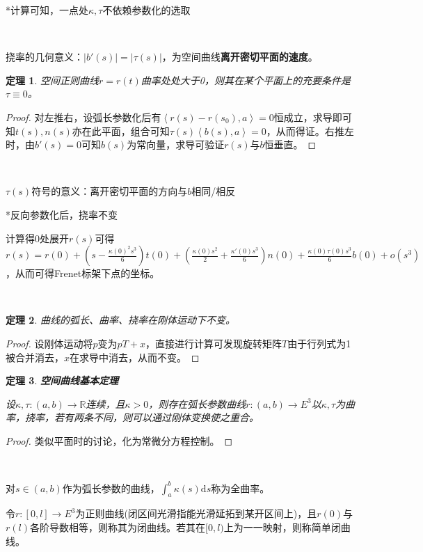 \documentclass[a4paper,UTF8,fontset=windows]{ctexart}
\newtheorem{thm}{定理}[section]
\begin{document}
*计算可知，一点处$\kappa,\tau$不依赖参数化的选取

\

挠率的几何意义：$|b'(s)|=|\tau(s)|$，为空间曲线\textbf{离开密切平面的速度}。

\begin{thm}
空间正则曲线$r=r(t)$曲率处处大于0，则其在某个平面上的充要条件是$\tau\equiv0$。
\end{thm}

\begin{proof}
对左推右，设弧长参数化后有$\left<r(s)-r(s_0),a\right>=0$恒成立，求导即可知$t(s),n(s)$亦在此平面，组合可知$\tau(s)\left<b(s),a\right>=0$，从而得证。右推左时，由$b'(s)=0$可知$b(s)$为常向量，求导可验证$r(s)$与$b$恒垂直。
\end{proof}

\

$\tau(s)$符号的意义：离开密切平面的方向与$b$相同/相反

*反向参数化后，挠率不变

计算得0处展开$r(s)$可得$r(s)=r(0)+(s-\frac{\kappa(0)^2s^3}{6})t(0)+(\frac{\kappa(0)s^2}{2}+\frac{\kappa'(0)s^3}{6})n(0)+\frac{\kappa(0)\tau(0)s^3}{6}b(0)+o(s^3)$，从而可得Frenet标架下点的坐标。

\

\begin{thm}
曲线的弧长、曲率、挠率在刚体运动下不变。
\end{thm}

\begin{proof}
设刚体运动将$p$变为$pT+x$，直接进行计算可发现旋转矩阵$T$由于行列式为1被合并消去，$x$在求导中消去，从而不变。
\end{proof}

\begin{thm} \textbf{\emph{空间曲线基本定理}}

设$\kappa,\tau:(a,b)\to\mathbb{R}$连续，且$\kappa>0$，则存在弧长参数曲线$r:(a,b)\to E^3$以$\kappa,\tau$为曲率，挠率，若有两条不同，则可以通过刚体变换使之重合。
\end{thm}

\begin{proof}
类似平面时的讨论，化为常微分方程控制。
\end{proof}

\

对$s\in(a,b)$作为弧长参数的曲线，$\int_a^b\kappa(s)\mathrm{d}s$称为全曲率。

令$r:[0,l]\to E^3$为正则曲线(闭区间光滑指能光滑延拓到某开区间上)，且$r(0)$与$r(l)$各阶导数相等，则称其为闭曲线。若其在$[0,l)$上为一一映射，则称简单闭曲线。
\end{document}
